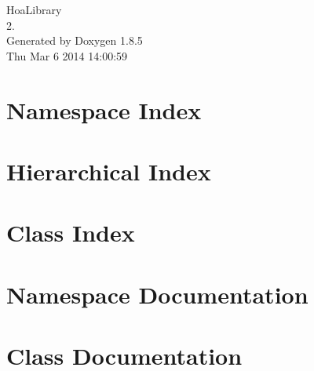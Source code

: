 \documentclass[twoside]{book}
\newcommand{\clearemptydoublepage}{%
  \newpage{\pagestyle{empty}\cleardoublepage}%
}
\begin{document}
\hypersetup{pageanchor=false}
\begin{titlepage}
\vspace*{7cm}
\begin{center}%
{\Large Hoa\-Library \\[1ex]\large 2. }\\
\vspace*{1cm}
{\large Generated by Doxygen 1.8.5}\\
\vspace*{0.5cm}
{\small Thu Mar 6 2014 14:00:59}\\
\end{center}
\end{titlepage}
\clearemptydoublepage
\tableofcontents
\clearemptydoublepage
{}
\hypersetup{pageanchor=true}

\chapter{Namespace Index}

\chapter{Hierarchical Index}

\chapter{Class Index}

\chapter{Namespace Documentation}



\chapter{Class Documentation}






































\newpage
{}
{}
\printindex
\end{document}
